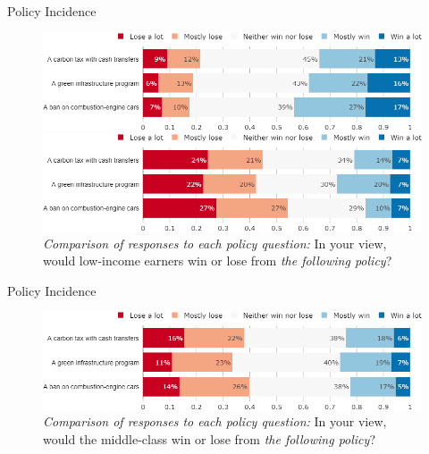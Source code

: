 \documentclass[aspectratio=169,9pt,dvipsnames]{beamer}
\begin{document}
\begin{frame}{Policy Incidence}%
\begin{figure}[h!]
\centering
\caption{\textit{Comparison of responses to each policy question:} In your view, would high-income earners win or lose from \textit{the following policy}?}
\includegraphics[width=.7\textwidth]{../figures/US/policies_win_lose_rich_US.png}
\vspace{-.1cm}
\centering
\caption{\textit{Comparison of responses to each policy question:} In your view, would low-income earners win or lose from \textit{the following policy}?}
\includegraphics[width=.7\textwidth]{../figures/US/policies_win_lose_poor_US.png}
\end{figure}
\end{frame}

\begin{frame}{Policy Incidence}%
\begin{figure}[h!]
\centering
\caption{\textit{Comparison of responses to each policy question:} In your view, would the middle-class win or lose from \textit{the following policy}?}
\includegraphics[width=.7\textwidth]{../figures/US/policies_win_lose_middle_US.png}
\end{figure}
\end{frame}
\end{document}
